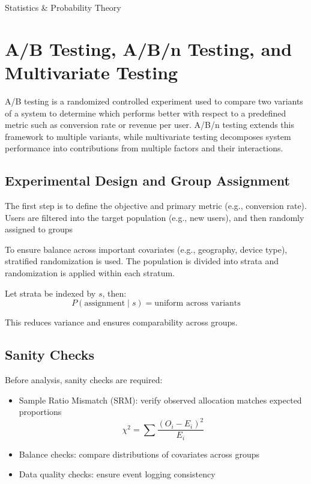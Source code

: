 \documentclass[10pt,a4paper]{article}
\newcommand{\NoteTitle}{Statistics \& Probability Theory}
\newcommand{\NoteAuthor}{Thomaskutty Reji}
\begin{document}
\begin{titlepage}
  \vspace*{0.25\textheight}
  {\LARGE \textcolor{tocblue}{\NoteTitle}}\par
  \author{\NoteAuthor}
  \date{}
\end{titlepage}

\label{toc}
\tableofcontents
\newpage
	
\section{A/B Testing, A/B/n Testing, and Multivariate Testing}
	
A/B testing is a randomized controlled experiment used to compare two variants of a system to determine which performs better with respect to a predefined metric such as conversion rate or revenue per user. A/B/n testing extends this framework to multiple variants, while multivariate testing decomposes system performance into contributions from multiple factors and their interactions.
	
\subsection{Experimental Design and Group Assignment}

The first step is to define the objective and primary metric (e.g., conversion rate). Users are filtered into the target population (e.g., new users), and then randomly assigned to groups

To ensure balance across important covariates (e.g., geography, device type), stratified randomization is used. The population is divided into strata and randomization is applied within each stratum.

Let strata be indexed by $s$, then:
\[
P(\text{assignment} \mid s) = \text{uniform across variants}
\]

This reduces variance and ensures comparability across groups.
	
\subsection{Sanity Checks}

Before analysis, sanity checks are required:

\begin{itemize}
\item Sample Ratio Mismatch (SRM): verify observed allocation matches expected proportions
\[
\chi^2 = \sum \frac{(O_i - E_i)^2}{E_i}
\]
\item Balance checks: compare distributions of covariates across groups
\item Data quality checks: ensure event logging consistency
\end{itemize}
\end{document}
